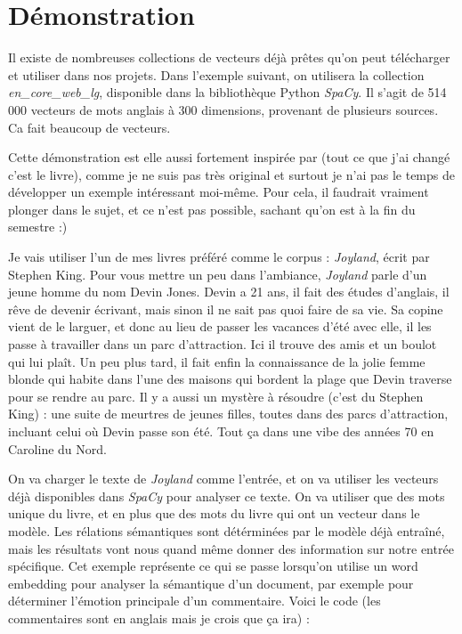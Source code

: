 \documentclass[11pt, a4paper]{report}
\begin{document}
\section{Démonstration}
Il existe de nombreuses collections de vecteurs déjà prêtes qu'on 
peut télécharger et utiliser dans nos projets. Dans l'exemple suivant, 
on utilisera la collection \textit{en\_core\_web\_lg}, disponible dans la bibliothèque Python 
\textit{SpaCy}. Il s'agit de 514 000 vecteurs de mots 
anglais à 300 dimensions, provenant de plusieurs sources. 
Ca fait beaucoup de vecteurs. 

Cette démonstration est elle aussi fortement inspirée par
\cite[\textit{Understanding word vectors}, Allison PARISH]{understanding-word-vectors} (tout ce que j'ai changé c'est le livre),
comme je ne suis pas très original et surtout je n'ai pas le temps de développer un exemple intéressant 
moi-même. Pour cela, il faudrait vraiment plonger dans le sujet, et ce n'est pas 
possible, sachant qu'on est à la fin du semestre :)

Je vais utiliser l'un de mes livres préféré comme le corpus : 
\textit{Joyland}, écrit par Stephen King. Pour vous mettre un peu dans l'ambiance, 
\textit{Joyland} parle d'un jeune homme du nom Devin Jones. Devin a 21 ans, il fait 
des études d'anglais, il rêve de devenir écrivant, mais sinon il ne sait pas 
quoi faire de sa vie. Sa copine vient de le larguer, et donc au lieu de 
passer les vacances d'été avec elle, il les passe à travailler dans un parc 
d'attraction. Ici il trouve des amis et un boulot qui lui plaît. Un peu plus tard, 
il fait enfin la connaissance de la jolie femme blonde qui habite dans l'une des maisons 
qui bordent la plage que Devin traverse pour se rendre au parc. Il y a aussi 
un mystère à résoudre (c'est du Stephen King) : une suite de meurtres de jeunes 
filles, toutes dans des parcs d'attraction, incluant celui où Devin passe son été. 
Tout ça dans une vibe des années 70 en Caroline du Nord. 

On va charger le texte de \textit{Joyland} comme l'entrée, et on va utiliser les 
vecteurs déjà disponibles dans \textit{SpaCy} pour analyser ce texte. On va utiliser que 
des mots unique du livre, et en plus que des mots du livre qui ont un vecteur dans le 
modèle. Les rélations sémantiques sont détérminées par le modèle déjà entraîné, mais 
les résultats vont nous quand même donner des information sur notre entrée spécifique. 
Cet exemple représente ce qui se passe lorsqu'on utilise un word embedding pour analyser 
la sémantique d'un document, par exemple pour déterminer l'émotion principale d'un commentaire.
Voici le code (les commentaires sont en anglais mais je crois que ça ira) \cite{gensim-tuto}: 
\end{document}
